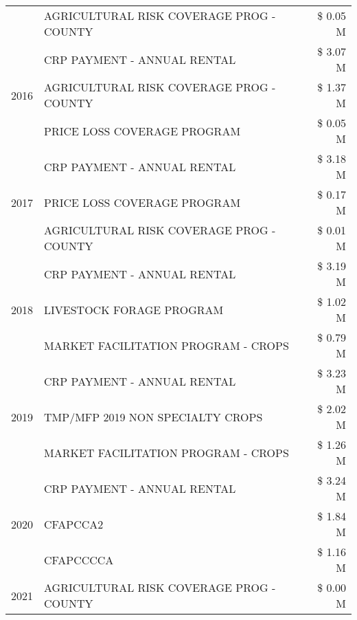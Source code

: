 \begin{tabular}{llr}
 & AGRICULTURAL RISK COVERAGE PROG - COUNTY & \$ 0.05 M \\
\cline{1-3}
\multirow[t]{3}{*}{2016} & CRP PAYMENT - ANNUAL RENTAL & \$ 3.07 M \\
 & AGRICULTURAL RISK COVERAGE PROG - COUNTY & \$ 1.37 M \\
 & PRICE LOSS COVERAGE PROGRAM & \$ 0.05 M \\
\cline{1-3}
\multirow[t]{3}{*}{2017} & CRP PAYMENT - ANNUAL RENTAL & \$ 3.18 M \\
 & PRICE LOSS COVERAGE PROGRAM & \$ 0.17 M \\
 & AGRICULTURAL RISK COVERAGE PROG - COUNTY & \$ 0.01 M \\
\cline{1-3}
\multirow[t]{3}{*}{2018} & CRP PAYMENT - ANNUAL RENTAL & \$ 3.19 M \\
 & LIVESTOCK FORAGE PROGRAM & \$ 1.02 M \\
 & MARKET FACILITATION PROGRAM - CROPS & \$ 0.79 M \\
\cline{1-3}
\multirow[t]{3}{*}{2019} & CRP PAYMENT - ANNUAL RENTAL & \$ 3.23 M \\
 & TMP/MFP 2019 NON SPECIALTY CROPS & \$ 2.02 M \\
 & MARKET FACILITATION PROGRAM - CROPS & \$ 1.26 M \\
\cline{1-3}
\multirow[t]{3}{*}{2020} & CRP PAYMENT - ANNUAL RENTAL & \$ 3.24 M \\
 & CFAPCCA2 & \$ 1.84 M \\
 & CFAPCCCCA & \$ 1.16 M \\
\cline{1-3}
2021 & AGRICULTURAL RISK COVERAGE PROG - COUNTY & \$ 0.00 M \\
\cline{1-3}
\bottomrule
\end{tabular}
